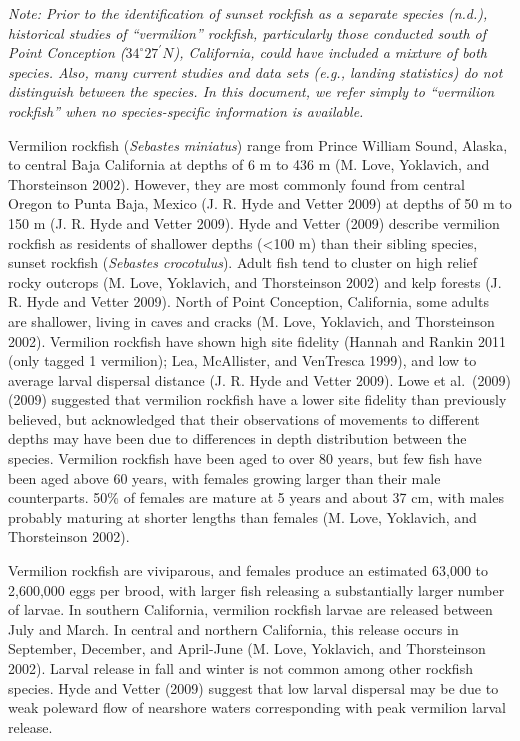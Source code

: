 \documentclass[
  english,
  a4paper,
]{article}
\begin{document}
\emph{Note: Prior to the identification of sunset rockfish as a separate species (n.d.), historical studies of ``vermilion'' rockfish, particularly those conducted south of Point Conception ($34^\circ 27^\prime N$), California, could have included a mixture of both species. Also, many current studies and data sets (e.g., landing statistics) do not distinguish between the species. In this document, we refer simply to ``vermilion rockfish'' when no species-specific information is available.}

Vermilion rockfish (\emph{Sebastes miniatus}) range from Prince William Sound, Alaska, to central Baja California at
depths of 6 m to 436 m (M. Love, Yoklavich, and Thorsteinson 2002). However, they are most commonly found from central Oregon
to Punta Baja, Mexico (J. R. Hyde and Vetter 2009) at depths of 50 m to 150 m (J. R. Hyde and Vetter 2009). Hyde and Vetter
(2009) describe vermilion rockfish as residents of shallower depths (\textless100 m) than their sibling species,
sunset rockfish (\emph{Sebastes crocotulus}). Adult fish tend to cluster on high relief rocky outcrops (M. Love, Yoklavich, and Thorsteinson 2002)
and kelp forests (J. R. Hyde and Vetter 2009). North of Point Conception, California, some adults are shallower,
living in caves and cracks (M. Love, Yoklavich, and Thorsteinson 2002). Vermilion rockfish have shown high site fidelity
(Hannah and Rankin 2011 (only tagged 1 vermilion); Lea, McAllister, and VenTresca 1999), and low to average larval dispersal
distance (J. R. Hyde and Vetter 2009). Lowe et al.~(2009) (2009) suggested that vermilion rockfish
have a lower site fidelity than previously believed, but acknowledged that their
observations of movements to different depths may have been due to differences in depth distribution between the species.
Vermilion rockfish have been aged to over 80 years, but few fish have been aged above 60 years, with females growing larger than their male counterparts. 50\% of females are mature at 5 years and about
37 cm, with males probably maturing at shorter lengths than females (M. Love, Yoklavich, and Thorsteinson 2002).

Vermilion rockfish are viviparous, and females produce an estimated 63,000 to 2,600,000 eggs per brood, with larger fish releasing a substantially larger number of larvae.
In southern California, vermilion rockfish larvae are released between July and March.
In central and northern California, this release occurs in September, December, and
April-June (M. Love, Yoklavich, and Thorsteinson 2002). Larval release in fall and winter is not common among other
rockfish species. Hyde and Vetter (2009) suggest that low larval dispersal may
be due to weak poleward flow of nearshore waters corresponding with peak vermilion larval release.
\end{document}
